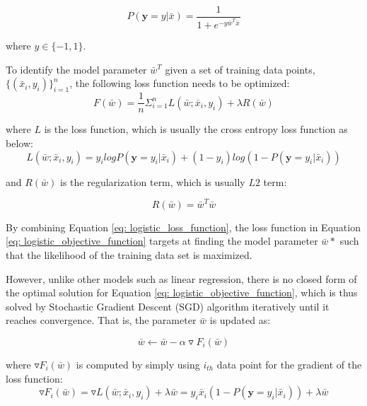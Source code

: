 \begin{equation}\label{eq: logistic_regression_prob}
    P(\textbf{y}=y|\bar{x}) = \frac{1}{1+e^{-y\bar{w}^T\bar{x}}}
\end{equation}

where $y \in \{-1,1\}$.

To identify the model parameter $\bar{w}^T$ given a set of training data points, $\{(\bar{x}_i, y_i)\}_{i=1}^n$, the following loss function needs to be optimized:
\begin{equation}\label{eq: logistic_objective_function}
    F(\bar{w}) = \frac{1}{n}\Sigma_{i=1}^nL(\bar{w};\bar{x}_i, y_i) + \lambda R(\bar{w})
\end{equation}

where $L$ is the loss function, which is usually the cross entropy loss function as below:
\begin{equation}\label{eq: logistic_loss_function}
    L(\bar{w}; \bar{x}_i, y_i) = y_ilogP(\textbf{y}=y_i|\bar{x}_i) + (1-y_i)log(1-P(\textbf{y}=y_i|\bar{x}_i))
\end{equation}

and $R(\bar{w})$ is the regularization term, which is usually $L2$ term:

\begin{equation}
    R(\bar{w}) = \bar{w}^T\bar{w}
\end{equation}


By combining Equation \ref{eq: logistic_loss_function}, the loss function in Equation \ref{eq: logistic_objective_function} targets at finding the model parameter $\bar{w}*$ such that the likelihood of the training data set is maximized. 

However, unlike other models such as linear regression, there is no closed form of the optimal solution for Equation \ref{eq: logistic_objective_function}, which is thus solved by Stochastic Gradient Descent (SGD) algorithm \cite{robert2014machine} iteratively until it reaches convergence. That is, the parameter $\bar{w}$ is updated as:

\begin{equation}
    \bar{w} \leftarrow \bar{w} - \alpha \triangledown F_i(\bar{w})
\end{equation}

where $\triangledown F_i(\bar{w})$ is computed by simply using $i_{th}$ data point for the gradient of the loss function:
\begin{equation}
    \triangledown F_i(\bar{w}) = \triangledown L(\bar{w};\bar{x}_i,y_i) + \lambda \bar{w} = y_i\bar{x}_i(1-P(\textbf{y}=y_i|\bar{x}_i)) + \lambda \bar{w}
\end{equation}

